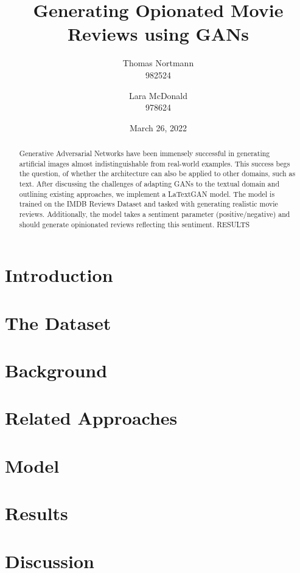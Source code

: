 \documentclass{report}
\title{Generating Opionated Movie Reviews using GANs}
\author{Thomas Nortmann \\
982524
	\and 
	Lara McDonald \\
	978624
	}
\date{March 26,  2022}
\begin{document}
\maketitle


\begin{abstract}
Generative Adversarial Networks have been immensely successful in generating artificial images almost indistinguishable from real-world examples.  This success begs the question, of whether the architecture can also be applied to other domains, such as text. After discussing the challenges of adapting GANs to the textual domain and outlining existing approaches, we implement a LaTextGAN model. The model is trained on the IMDB Reviews Dataset and tasked with generating realistic movie reviews.  Additionally, the model takes a sentiment parameter (positive/negative) and should generate opinionated reviews reflecting this sentiment.  RESULTS
\end{abstract}

\section{Introduction}


\section{The Dataset}


\section{Background}


\section{Related Approaches}


\section{Model}


\section{Results}


\section{Discussion}




\end{document}
